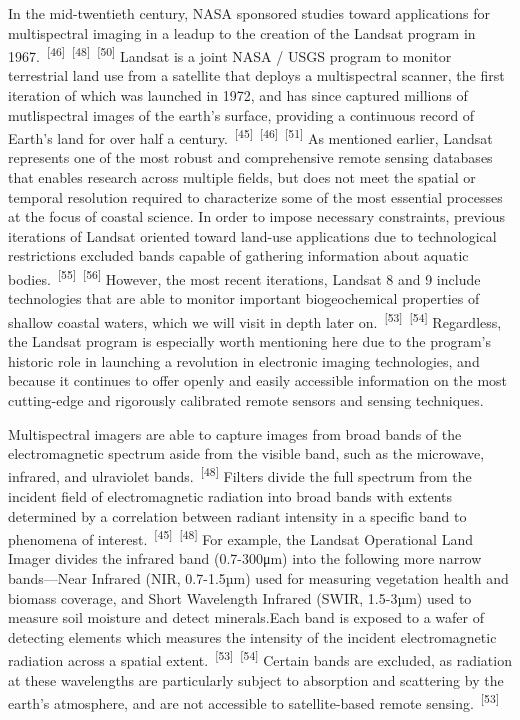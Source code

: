 \documentclass{article}
\begin{document}
\par{In the mid-twentieth century, NASA sponsored studies toward applications for multispectral imaging in a leadup to the creation of the Landsat program in 1967.~\textsuperscript{[46]}~\textsuperscript{[48]}~\textsuperscript{[50]} Landsat is a joint NASA / USGS program to monitor terrestrial land use from a satellite that deploys a multispectral scanner, the first iteration of which was launched in 1972, and has since captured millions of mutlispectral images of the earth's surface, providing a continuous record of Earth's land for over half a century.~\textsuperscript{[45]}~\textsuperscript{[46]}~\textsuperscript{[51]} As mentioned earlier, Landsat represents one of the most robust and comprehensive remote sensing databases that enables research across multiple fields, but does not meet the spatial or temporal resolution required to characterize some of the most essential processes at the focus of coastal science. In order to impose necessary constraints, previous iterations of Landsat oriented toward land-use applications due to technological restrictions excluded bands capable of gathering information about aquatic bodies.~\textsuperscript{[55]}~\textsuperscript{[56]} However, the most recent iterations, Landsat 8 and 9 include technologies that are able to monitor important biogeochemical properties of shallow coastal waters, which we will visit in depth later on.~\textsuperscript{[53]}~\textsuperscript{[54]} Regardless, the Landsat program is especially worth mentioning here due to the program's historic role in launching a revolution in electronic imaging technologies, and because it continues to offer openly and easily accessible information on the most cutting-edge and rigorously calibrated remote sensors and sensing techniques.}


\par{Multispectral imagers are able to capture images from broad bands of the electromagnetic spectrum aside from the visible band, such as the microwave, infrared, and ulraviolet bands.~\textsuperscript{[48]} Filters divide the full spectrum from the incident field of electromagnetic radiation into broad bands with extents determined by a correlation between radiant intensity in a specific band to phenomena of interest.~\textsuperscript{[45]}~\textsuperscript{[48]} For example, the Landsat Operational Land Imager divides the infrared band (0.7-300μm) into the following more narrow bands---Near Infrared (NIR, 0.7-1.5µm) used for measuring vegetation health and biomass coverage, and Short Wavelength Infrared (SWIR, 1.5-3µm) used to measure soil moisture and detect minerals.Each band is exposed to a wafer of detecting elements which measures the intensity of the incident electromagnetic radiation across a spatial extent.~\textsuperscript{[53]}~\textsuperscript{[54]} Certain bands are excluded, as radiation at these wavelengths are particularly subject to absorption and scattering by the earth's atmosphere, and are not accessible to satellite-based remote sensing.~\textsuperscript{[53]}}
\end{document}
